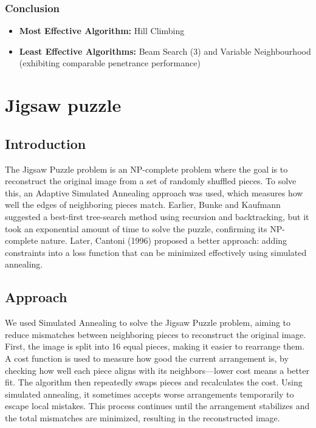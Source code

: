 \documentclass[conference]{IEEEtran}
\begin{document}
\subsubsection{Conclusion}
\begin{itemize}
  \item \textbf{Most Effective Algorithm:} Hill Climbing
  \item \textbf{Least Effective Algorithms:} Beam Search (3) and Variable Neighbourhood (exhibiting comparable penetrance performance)
\end{itemize}





\section{Jigsaw puzzle}



\subsection{Introduction}
The Jigsaw Puzzle problem is an NP-complete problem where the goal is to reconstruct the original image from a set of randomly shuffled pieces. To solve this, an Adaptive Simulated Annealing approach was used, which measures how well the edges of neighboring pieces match. Earlier, Bunke and Kaufmann suggested a best-first tree-search method using recursion and backtracking, but it took an exponential amount of time to solve the puzzle, confirming its NP-complete nature. Later, Cantoni (1996) proposed a better approach: adding constraints into a loss function that can be minimized effectively using simulated annealing.


\subsection{Approach}

We used Simulated Annealing to solve the Jigsaw Puzzle problem, aiming to reduce mismatches between neighboring pieces to reconstruct the original image. First, the image is split into 16 equal pieces, making it easier to rearrange them. A cost function is used to measure how good the current arrangement is, by checking how well each piece aligns with its neighbors—lower cost means a better fit. The algorithm then repeatedly swaps pieces and recalculates the cost. Using simulated annealing, it sometimes accepts worse arrangements temporarily to escape local mistakes. This process continues until the arrangement stabilizes and the total mismatches are minimized, resulting in the reconstructed image.
\\
\\
\end{document}
